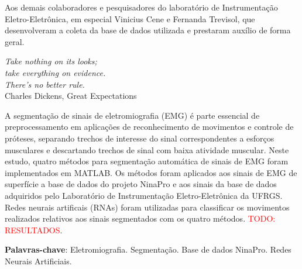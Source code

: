 
\begin{agradecimentos}
	Aos demais colaboradores e pesquisadores do laboratório de Instrumentação Eletro-Eletrônica, em especial Vinicius Cene e Fernanda Trevisol, que desenvolveram a coleta da base de dados utilizada e prestaram auxílio de forma geral.
\end{agradecimentos}


\begin{epigrafe}
    \vspace*{\fill}
	\begin{flushright}
		\textit{Take nothing on its looks;\\ take everything on evidence.\\ There's no better rule.}\\ \vspace{\onelineskip}
		Charles Dickens, Great Expectations
	\end{flushright}
\end{epigrafe}


\setlength{\absparsep}{18pt} %
\begin{resumo}

	A segmentação de sinais de eletromiografia (EMG) é parte essencial de preprocessamento em aplicações de reconhecimento de movimentos e controle de próteses, separando trechos de interesse do sinal correspondentes a esforços musculares e descartando trechos de sinal com baixa atividade muscular. Neste estudo, quatro métodos para segmentação automática de sinais de EMG foram implementados em MATLAB. Os métodos foram aplicados aos sinais de EMG de superfície a base de dados do projeto NinaPro e aos sinais da base de dados adquiridos pelo Laboratório de Instrumentação Eletro-Eletrônica da UFRGS. Redes neurais artificais (RNAs) foram utilizadas para classificar os movimentos realizados relativos aos sinais segmentados com os quatro métodos. \textcolor{red}{TODO: RESULTADOS}.

	\vspace{\onelineskip}
	\textbf{Palavras-chave}: Eletromiografia. Segmentação. Base de dados NinaPro. Redes Neurais Artificiais.
\end{resumo}

